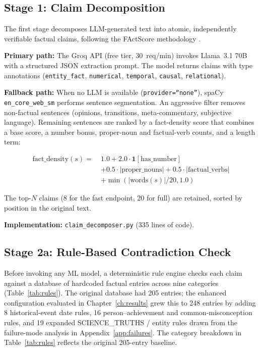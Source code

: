 \documentclass[12pt, a4paper, oneside]{report}
\begin{document}
\subsection{Stage 1: Claim Decomposition}
\label{sec:decomposition}

The first stage decomposes LLM-generated text into atomic, independently verifiable factual claims, following the FActScore methodology \cite{min2023factscore}.

\textbf{Primary path:} The Groq API (free tier, 30~req/min) invokes Llama~3.1 70B with a structured JSON extraction prompt. The model returns claims with type annotations (\texttt{entity\_fact}, \texttt{numerical}, \texttt{temporal}, \texttt{causal}, \texttt{relational}).

\textbf{Fallback path:} When no LLM is available (\texttt{provider=``none''}), spaCy \texttt{en\_core\_web\_sm} performs sentence segmentation. An aggressive filter removes non-factual sentences (opinions, transitions, meta-commentary, subjective language). Remaining sentences are ranked by a fact-density score that combines a base score, a number bonus, proper-noun and factual-verb counts, and a length term:

\begin{equation}
\begin{aligned}
\text{fact\_density}(s) =\ & 1.0 + 2.0 \cdot \mathbf{1}[\text{has\_number}] \\
                          & + 0.5 \cdot |\text{proper\_nouns}| + 0.5 \cdot |\text{factual\_verbs}| \\
                          & + \min(|\text{words}(s)|/20, 1.0)
\end{aligned}
\tag{Eq.\ 1}
\end{equation}

The top-$N$ claims (8 for the fast endpoint, 20 for full) are retained, sorted by position in the original text.

\textbf{Implementation:} \texttt{claim\_decomposer.py} (335 lines of code).

\subsection{Stage 2a: Rule-Based Contradiction Check}
\label{sec:rules}

Before invoking any ML model, a deterministic rule engine checks each claim against a database of hardcoded factual entries across nine categories (Table~\ref{tab:rules}). The original database had 205 entries; the enhanced configuration evaluated in Chapter~\ref{ch:results} grew this to 248 entries by adding 8 historical-event date rules, 16 person--achievement and common-misconception rules, and 19 expanded SCIENCE\_TRUTHS / entity rules drawn from the failure-mode analysis in Appendix~\ref{app:failures}. The category breakdown in Table~\ref{tab:rules} reflects the original 205-entry baseline.
\end{document}
